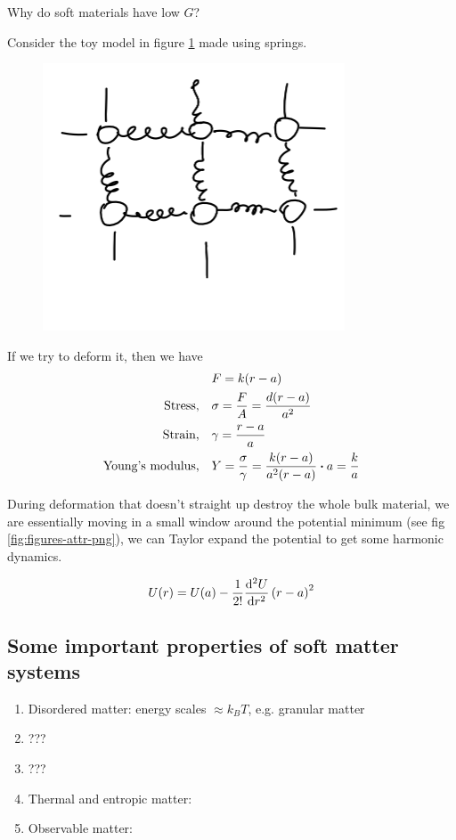 \documentclass[a4paper]{article}
\begin{document}
Why do soft materials have low $G$?

Consider the toy model in figure \ref{fig:spring-png} made using springs.

\begin{figure}[h]
	\centering
	\includegraphics[width=0.8\textwidth]{figures/spring.png}
	\caption{}
	\label{fig:spring-png}
\end{figure}
If we try to deform it, then we have
\begin{equation}
	\begin{split}
		&F = k(r - a)\\
		\text{Stress,}\quad&\sigma = \frac{F}{A} = \frac{d(r-a)}{a^2}\\
			\text{Strain,}\quad &\gamma = \frac{r-a}{a}\\
			\text{Young's modulus,}\quad &Y = \frac{\sigma}{\gamma} = \frac{k(r-a)}{a^2(r -a)}\vdot a = \frac{k}{a}
	\end{split}
\end{equation}

During deformation that doesn't straight up destroy the whole bulk
material, we are essentially moving in a small window around the
potential minimum (see fig \ref{fig:figures-attr-png}), we can Taylor
expand the potential to get some harmonic dynamics.

\begin{equation}
	U(r) = U(a) - \frac{1}{2!}\dv[2]{U}{r} \left( r -a \right) ^2
\end{equation}


\subsection*{Some important properties of soft matter systems}
\begin{enumerate}
	\item Disordered matter: energy scales $\approx k_B T$, e.g. granular matter
	\item  ???
	\item ???
	\item Thermal and entropic matter: 
	\item Observable matter: 
\end{enumerate}
\end{document}

